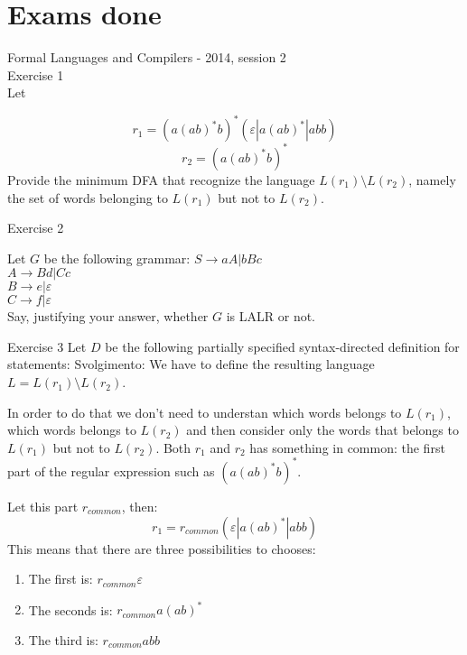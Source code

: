 \chapter{Exams done}

Formal Languages and Compilers - 2014, session 2\\
Exercise 1\\
Let

\begin{equation}
r_1 = (a(ab)^*b)^*(\varepsilon|a(ab)^*|abb)
\end{equation}
\begin{equation}
r_2 = (a(ab)^*b)^*
\end{equation}
\newline
Provide the minimum DFA that recognize the language $L(r_1) \setminus L(r_2)$, namely the set of words belonging to $L(r_1)$ but not to $L(r_2)$.

Exercise 2

Let $G$ be the following grammar:
$ S \rightarrow aA | bBc $ \\
$ A \rightarrow Bd | Cc $ \\
$ B \rightarrow e | \varepsilon $ \\
$ C \rightarrow f | \varepsilon $ \\
\newline
Say, justifying your answer, whether $G$ is LALR or not.

Exercise 3
\newline
Let $D$ be the following partially specified syntax-directed definition for statements:
\newline
Svolgimento:
\newline
We have to define the resulting language $L = L(r_1) \setminus L(r_2)$.

In order to do that we don't need to understan which words belongs to $L(r_1)$, which words belongs to $L(r_2)$ and then consider only the words that belongs to $L(r_1)$ but not to $L(r_2)$.
Both $r_1$ and $r_2$ has something in common: the first part of the regular expression such as $(a(ab)^*b)^*$.

Let this part $r_{common}$, then:
\begin{equation}
r_1 = r_{common}(\varepsilon|a(ab)^*|abb)
\end{equation}
This means that there are three possibilities to chooses:
\begin{enumerate}
\item The first is: $r_{common}\varepsilon$
\item The seconds is: $r_{common}a(ab)^*$
\item The third is: $r_{common}abb$
\end{enumerate}

